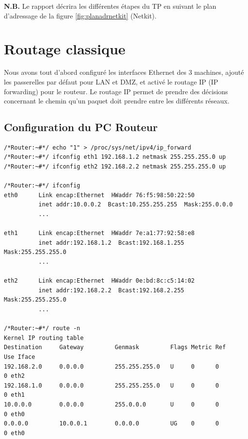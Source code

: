 \documentclass[frenchb, 11pt]{article}
\begin{document}
\noindent \textbf{N.B.} Le rapport décrira les différentes étapes du TP en suivant le plan d'adressage de la figure \ref{fig:planadrnetkit} (Netkit).


\newpage

\section{Routage classique}
Nous avons tout d'abord configuré les interfaces Ethernet des 3 machines, ajouté les passerelles par défaut pour LAN et DMZ, et activé le routage IP (IP forwarding) pour le routeur. Le routage IP permet de prendre des décisions concernant le chemin qu'un paquet doit prendre entre les différents réseaux.\\

\subsection{Configuration du PC Routeur}
\begin{lstlisting}
/*Router:~#*/ echo "1" > /proc/sys/net/ipv4/ip_forward
/*Router:~#*/ ifconfig eth1 192.168.1.2 netmask 255.255.255.0 up
/*Router:~#*/ ifconfig eth2 192.168.2.2 netmask 255.255.255.0 up

/*Router:~#*/ ifconfig
eth0      Link encap:Ethernet  HWaddr 76:f5:98:50:22:50
          inet addr:10.0.0.2  Bcast:10.255.255.255  Mask:255.0.0.0
          ...

eth1      Link encap:Ethernet  HWaddr 7e:a1:77:92:58:e8
          inet addr:192.168.1.2  Bcast:192.168.1.255  Mask:255.255.255.0
          ...

eth2      Link encap:Ethernet  HWaddr 0e:bd:8c:c5:14:02
          inet addr:192.168.2.2  Bcast:192.168.2.255  Mask:255.255.255.0
          ...

/*Router:~#*/ route -n
Kernel IP routing table
Destination     Gateway         Genmask         Flags Metric Ref    Use Iface
192.168.2.0     0.0.0.0         255.255.255.0   U     0      0        0 eth2
192.168.1.0     0.0.0.0         255.255.255.0   U     0      0        0 eth1
10.0.0.0        0.0.0.0         255.0.0.0       U     0      0        0 eth0
0.0.0.0         10.0.0.1        0.0.0.0         UG    0      0        0 eth0
\end{lstlisting}
\hfill
\end{document}
